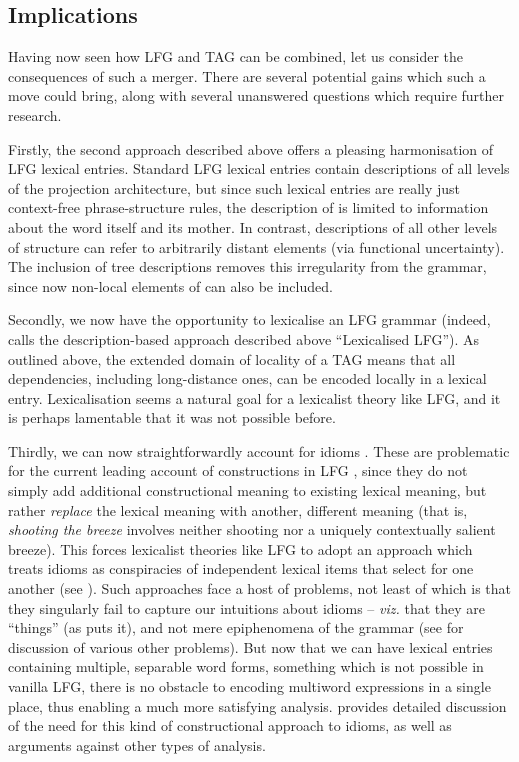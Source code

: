 \documentclass[output=paper,hidelinks]{langscibook}
\begin{document}

\subsection{Implications}\label{sec:TAG:implications}

Having now seen how LFG and TAG can be combined, let us consider the
consequences of such a merger. There are several potential gains which such a
move could bring, along with several unanswered questions which require further
research.

Firstly, the second approach described above offers a pleasing harmonisation of
LFG lexical entries. Standard LFG lexical entries contain descriptions of all
levels of the projection architecture, but since such lexical entries are really
just context-free phrase-structure rules, the description of \cstruc{} is
limited to information about the word itself and its mother. In contrast,
descriptions of all other levels of structure can refer to arbitrarily distant
elements (via functional uncertainty). The inclusion of tree descriptions
removes this irregularity from the grammar, since now non-local elements of
\cstruc{} can also be included.

Secondly, we now have the opportunity to lexicalise an LFG grammar (indeed,
\citealt[ch.~5]{findlay2019} calls the description-based approach described
above ``Lexicalised LFG''). As outlined above, the extended domain of locality of a TAG means
that all dependencies, including long-distance ones, can be encoded locally in a
lexical entry. Lexicalisation seems a natural goal for a lexicalist theory like
LFG, and it is perhaps lamentable that it was not possible before.

Thirdly, we can now straightforwardly account for idioms
\citep[ch.~6]{findlay2019}. These are problematic for the current leading
account of constructions in LFG \citep{asudeh2013constructions}, since they do
not simply add additional constructional meaning to existing lexical meaning,
but rather \emph{replace} the lexical meaning with another, different meaning
(that is, \textit{shooting the breeze} involves neither shooting nor a uniquely
contextually salient breeze). This forces lexicalist theories like LFG to adopt
an approach which treats idioms as conspiracies of independent lexical items
that select for one another (see \citealt[sec.~4.3]{findlay:lfg-as-cxg}). Such
approaches face a host of problems, not least of which is that they singularly
fail to capture our intuitions about idioms -- \textit{viz.} that they are
``things'' (as \citealt{williams:dumping} puts it), and not mere epiphenomena of
the grammar (see \citealt[58ff.]{findlay2019} for discussion of various other
problems). But now that we can have lexical entries containing multiple,
separable word forms, something which is not possible in vanilla LFG, there is
no obstacle to encoding multiword expressions in a single place, thus enabling a
much more satisfying analysis. \citet[ch.~3]{findlay2019} provides detailed
discussion of the need for this kind of constructional approach to idioms, as
well as arguments against other types of analysis.
\end{document}
